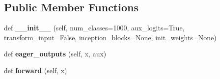 \subsection*{Public Member Functions}
\begin{DoxyCompactItemize}
\item 
\mbox{\label{classtorchvision_1_1models_1_1inception_1_1Inception3_acfa066467c9d6ac286c7e65eb2e9207f}} 
def {\bfseries \+\_\+\+\_\+init\+\_\+\+\_\+} (self, num\+\_\+classes=1000, aux\+\_\+logits=True, transform\+\_\+input=False, inception\+\_\+blocks=None, init\+\_\+weights=None)
\item 
\mbox{\label{classtorchvision_1_1models_1_1inception_1_1Inception3_aa42c1e7a9cdbac118aa22c1786b00538}} 
def {\bfseries eager\+\_\+outputs} (self, x, aux)
\item 
\mbox{\label{classtorchvision_1_1models_1_1inception_1_1Inception3_a8b514952b8e0bfaae60986ff7bc4eb8c}} 
def {\bfseries forward} (self, x)
\end{DoxyCompactItemize}
